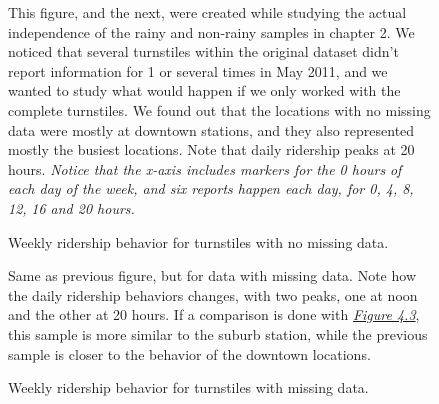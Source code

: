 \documentclass[a4paper,12pt,english]{sphinxmanual}
\begin{document}
\begin{figure}[htbp]
\centering
\capstart

\caption{Weekly ridership behavior for turnstiles with no missing data.}{\small 
This figure, and the next, were created while studying the actual
independence of the rainy and non-rainy samples in chapter 2. We noticed
that several turnstiles within the original dataset didn't report information
for 1 or several times in May 2011, and we wanted to study what would happen
if we only worked with the complete turnstiles. We found out that the
locations with no missing data were mostly at downtown stations, and they
also represented mostly the busiest locations. Note that daily ridership
peaks at 20 hours. \emph{Notice that the x-axis includes markers for the 0 hours}
\emph{of each day of the week, and six reports happen each day, for 0, 4, 8, 12,}
\emph{16 and 20 hours.}
}\label{section3:figure44}\end{figure}
\begin{figure}[htbp]
\centering
\capstart

\caption{Weekly ridership behavior for turnstiles with missing data.}{\small 
Same as previous figure, but for data with missing data. Note how the daily
ridership behaviors changes, with two peaks, one at noon and the other at 20
hours. If a comparison is done with {\hyperref[section3:figure43]{\emph{Figure 4.3}}}, this sample
is more similar to the suburb station, while the previous sample is closer
to the behavior of the downtown locations.
}\label{section3:figure44b}\end{figure}
\end{document}
